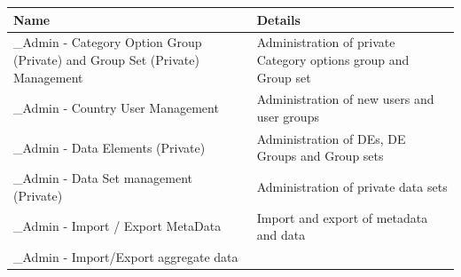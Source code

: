\documentclass[]{book}
\begin{document}
\begin{longtable}[]{@{}ll@{}}
\toprule
\begin{minipage}[b]{0.33\columnwidth}\raggedright
Name\strut
\end{minipage} & \begin{minipage}[b]{0.61\columnwidth}\raggedright
Details\strut
\end{minipage}\tabularnewline
\midrule
\endhead
\begin{minipage}[t]{0.33\columnwidth}\raggedright
\_Admin - Category Option Group (Private) and Group Set (Private) Management\strut
\end{minipage} & \begin{minipage}[t]{0.61\columnwidth}\raggedright
Administration of private Category options group and Group set\strut
\end{minipage}\tabularnewline
\begin{minipage}[t]{0.33\columnwidth}\raggedright
\_Admin - Country User Management\strut
\end{minipage} & \begin{minipage}[t]{0.61\columnwidth}\raggedright
Administration of new users and user groups\strut
\end{minipage}\tabularnewline
\begin{minipage}[t]{0.33\columnwidth}\raggedright
\_Admin - Data Elements (Private)\strut
\end{minipage} & \begin{minipage}[t]{0.61\columnwidth}\raggedright
Administration of DEs, DE Groups and Group sets\strut
\end{minipage}\tabularnewline
\begin{minipage}[t]{0.33\columnwidth}\raggedright
\_Admin - Data Set management (Private)\strut
\end{minipage} & \begin{minipage}[t]{0.61\columnwidth}\raggedright
Administration of private data sets\strut
\end{minipage}\tabularnewline
\begin{minipage}[t]{0.33\columnwidth}\raggedright
\_Admin - Import / Export MetaData\strut
\end{minipage} & \begin{minipage}[t]{0.61\columnwidth}\raggedright
Import and export of metadata and data\strut
\end{minipage}\tabularnewline
\begin{minipage}[t]{0.33\columnwidth}\raggedright
\_Admin - Import/Export aggregate data\strut

\end{minipage}
\end{longtable}
\end{document}
